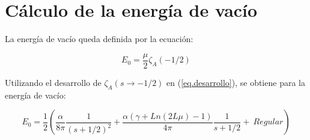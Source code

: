 \begin{comment}
A la hora de calcular los términos de la forma $S'/S$ hay que tener en cuenta hasta que orden hay que llevar el numerado y el denominador para poder ser consistente con la expansión en serie.

\begin{equation}
\begin{array}{c}
\frac{S'(x)}{S(x)} =
\frac{
		- \sum _{n=1} ^{\infty} \frac{n a_n}{x ^{n+1}}
      }
      {
		1 + \sum _{m=1} ^{\infty} \frac{a _n}{x ^{n}}
            } =
            

\left(
	    - \sum _{n=1} ^{\infty} \frac{n a_n}{x ^{n+1}}
		\right)
\sum _{p =0} ^{\infty}
		\left(
			    \sum _{m=1} ^{\infty} \frac{a _n}{x ^{n}}
	    		\right) ^{p}
\end{array}
\end{equation}

Donde se puede hacer el producto de Cauchy para tener la solución exacta de hasta que términos hay que desarrollar $S,S'$ y la Serie Geométrica.
\end{comment}
\begin{comment}
\begin{equation}
\frac{1 }{2 \pi i}
\int _{circulo} \lambda ^{-2s } \partial \lambda \ Ln \left[
					\frac{e ^{\frac{i \alpha Ln( 2 \lambda L )}{2 \lambda}} e ^{2 i \lambda L} S1}
					{\Gamma \left( 1 - \frac{i \alpha}{2 \lambda} \right)} - 
					\frac{e ^{\frac{-i \alpha Ln(2 \lambda L )}{2 \lambda}} S2}
					{\Gamma \left( 1 + \frac{i \alpha}{2 \lambda} \right)}					
					\right] d \lambda
\end{equation}
\end{comment}


\section{Cálculo de la energía de vacío}

La energía de vacío queda definida por la ecuación: 

\begin{equation}
    E _0 = \frac{\mu }{2}  
    \zeta _A \left( - 1/2 \right) 
\end{equation}

Utilizando el desarrollo de $\zeta _A (s \rightarrow -1/2)$ en (\ref{eq.desarrollo}), se obtiene para la energía de vacío:

\begin{equation}
E _0 = \frac{1}{2} \left(
				\frac{\alpha}{8 \pi  } \frac{1}{(s+1/2)^2} + 
				\frac{\alpha ( \gamma  + Ln(2L \mu ) -1 )}{4 \pi  } \frac{1}{s+1/2} +
				\ Regular
				\right)
\end{equation}

 
